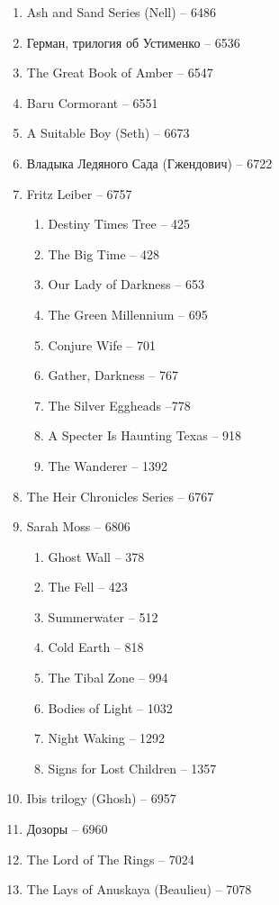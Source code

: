 \documentclass[a4paper, 11pt]{proc} %
\begin{document}
\begin{enumerate}
    \item Ash and Sand Series (Nell) -- 6486
    \item Герман, трилогия об Устименко -- 6536
    \item The Great Book of Amber -- 6547
    \item Baru Cormorant -- 6551
    \item A Suitable Boy (Seth) -- 6673
    \item Владыка Ледяного Сада (Гжендович) -- 6722
    \item Fritz Leiber -- 6757
        \begin{enumerate}
            \item Destiny Times Tree -- 425
            \item The Big Time -- 428
            \item Our Lady of Darkness -- 653
            \item The Green Millennium -- 695
            \item Conjure Wife -- 701
            \item Gather, Darkness -- 767
            \item The Silver Eggheads --778
            \item A Specter Is Haunting Texas -- 918
            \item The Wanderer -- 1392
        \end{enumerate}
    \item The Heir Chronicles Series -- 6767
    \item Sarah Moss -- 6806
        \begin{enumerate}
            \item Ghost Wall -- 378
            \item The Fell -- 423
            \item Summerwater -- 512
            \item Cold Earth -- 818
            \item The Tibal Zone -- 994
            \item Bodies of Light -- 1032
            \item Night Waking -- 1292
            \item Signs for Lost Children -- 1357
        \end{enumerate}
    \item Ibis trilogy (Ghosh) -- 6957
    \item Дозоры -- 6960
    \item The Lord of The Rings -- 7024
    \item The Lays of Anuskaya (Beaulieu) -- 7078

\end{enumerate}
\end{document}
